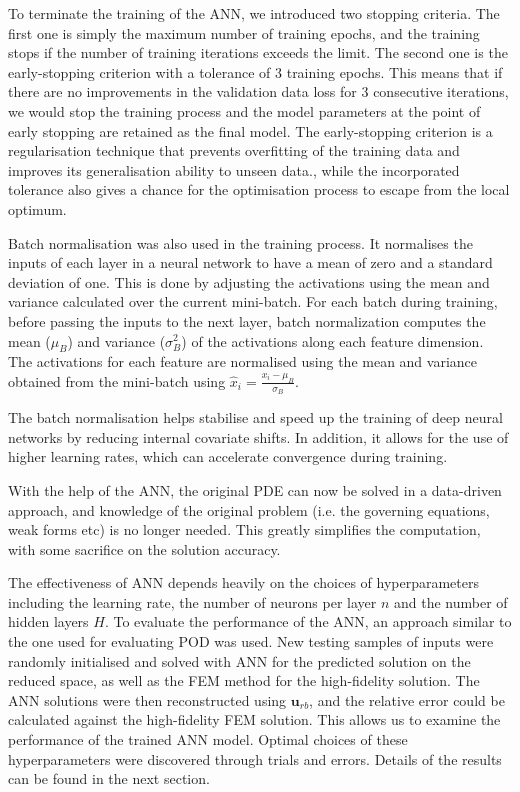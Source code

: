 To terminate the training of the ANN, we introduced two stopping criteria. The first one is simply the maximum number of training epochs, and the training stops if the number of training iterations exceeds the limit. The second one is the early-stopping criterion with a tolerance of 3 training epochs. This means that if there are no improvements in the validation data loss for 3 consecutive iterations, we would stop the training process and the model parameters at the point of early stopping are retained as the final model. The early-stopping criterion is a regularisation technique that prevents overfitting of the training data and improves its generalisation ability to unseen data., while the incorporated tolerance also gives a chance for the optimisation process to escape from the local optimum.  

Batch normalisation was also used in the training process. It normalises the inputs of each layer in a neural network to have a mean of zero and a standard deviation of one. This is done by adjusting the activations using the mean and variance calculated over the current mini-batch. For each batch during training, before passing the inputs to the next layer, batch normalization computes the mean ($\mu_B$) and variance ($\sigma^2_B$) of the activations along each feature dimension. The activations for each feature are normalised using the mean and variance obtained from the mini-batch using $\hat{x}_i = \frac{x_i - \mu_B}{\sigma_B}$.

The batch normalisation helps stabilise and speed up the training of deep neural networks by reducing internal covariate shifts. In addition, it allows for the use of higher learning rates, which can accelerate convergence during training.

With the help of the ANN, the original PDE can now be solved in a data-driven approach, and knowledge of the original problem (i.e. the governing equations, weak forms etc) is no longer needed. This greatly simplifies the computation, with some sacrifice on the solution accuracy. 

The effectiveness of ANN depends heavily on the choices of hyperparameters including the learning rate, the number of neurons per layer $n$ and the number of hidden layers $H$. To evaluate the performance of the ANN, an approach similar to the one used for evaluating POD was used. New testing samples of inputs were randomly initialised and solved with ANN for the predicted solution on the reduced space, as well as the FEM method for the high-fidelity solution. The ANN solutions were then reconstructed using $\mathbf{u}_{rb}$, and the relative error could be calculated against the high-fidelity FEM solution. This allows us to examine the performance of the trained ANN model. Optimal choices of these hyperparameters were discovered through trials and errors. Details of the results can be found in the next section. 


